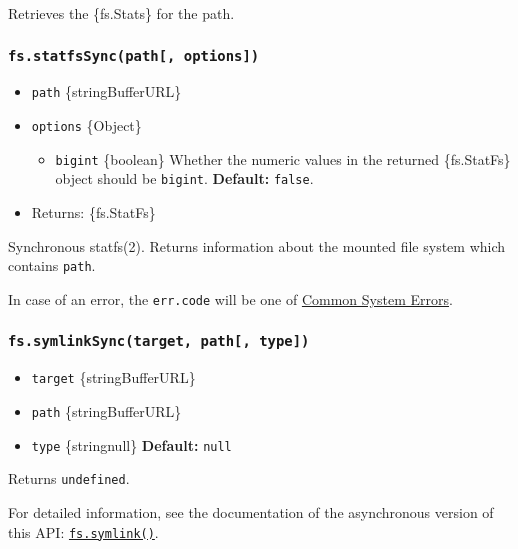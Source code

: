 Retrieves the \{fs.Stats\} for the path.

\subsubsection{\texorpdfstring{\texttt{fs.statfsSync(path{[},\ options{]})}}{fs.statfsSync(path{[}, options{]})}}\label{fs.statfssyncpath-options}

\begin{itemize}
\tightlist
\item
  \texttt{path} \{string\textbar Buffer\textbar URL\}
\item
  \texttt{options} \{Object\}

  \begin{itemize}
  \tightlist
  \item
    \texttt{bigint} \{boolean\} Whether the numeric values in the
    returned \{fs.StatFs\} object should be \texttt{bigint}.
    \textbf{Default:} \texttt{false}.
  \end{itemize}
\item
  Returns: \{fs.StatFs\}
\end{itemize}

Synchronous statfs(2). Returns information about the mounted file system
which contains \texttt{path}.

In case of an error, the \texttt{err.code} will be one of
\href{errors.md\#common-system-errors}{Common System Errors}.

\subsubsection{\texorpdfstring{\texttt{fs.symlinkSync(target,\ path{[},\ type{]})}}{fs.symlinkSync(target, path{[}, type{]})}}\label{fs.symlinksynctarget-path-type}

\begin{itemize}
\tightlist
\item
  \texttt{target} \{string\textbar Buffer\textbar URL\}
\item
  \texttt{path} \{string\textbar Buffer\textbar URL\}
\item
  \texttt{type} \{string\textbar null\} \textbf{Default:} \texttt{null}
\end{itemize}

Returns \texttt{undefined}.

For detailed information, see the documentation of the asynchronous
version of this API:
\hyperref[fssymlinktarget-path-type-callback]{\texttt{fs.symlink()}}.

